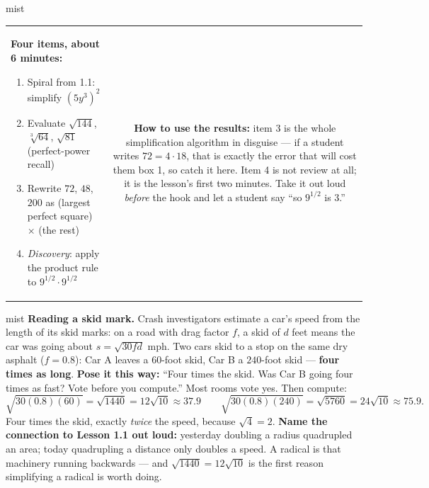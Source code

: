 \documentclass[10pt]{article}
\begin{document}
\begin{fixedskillbox}{mist}
\begin{tabularx}{\linewidth}{@{}X c@{}}
\begin{minipage}[t]{0.55\linewidth}\vspace{0pt}
\textbf{Four items, about 6 minutes:}
\begin{enumerate}[leftmargin=1.4em, itemsep=1pt, topsep=2pt]
  \item Spiral from 1.1: simplify $\left(5y^3\right)^2$
  \item Evaluate $\sqrt{144}$, $\sqrt[3]{64}$, $\sqrt{81}$ (perfect-power recall)
  \item Rewrite $72$, $48$, $200$ as (largest perfect square) $\times$ (the rest)
  \item \emph{Discovery}: apply the product rule to $9^{1/2}\cdot 9^{1/2}$
\end{enumerate}
\end{minipage}
&
\begin{minipage}[t]{0.38\linewidth}\vspace{0pt}
\textbf{How to use the results:} item 3 is the whole simplification algorithm in disguise --- if a
student writes $72=4\cdot 18$, that is exactly the error that will cost them box 1, so catch it
here. Item 4 is not review at all; it is the lesson's first two minutes. Take it out loud
\emph{before} the hook and let a student say ``so $9^{1/2}$ is $3$.''
\end{minipage}
\end{tabularx}
\end{fixedskillbox}

\begin{skillbox}[Hook]{mist}
\textbf{Reading a skid mark.} Crash investigators estimate a car's speed from the length of its
skid marks: on a road with drag factor $f$, a skid of $d$ feet means the car was going about
$s=\sqrt{30fd}$ mph. Two cars skid to a stop on the same dry asphalt ($f=0.8$): Car A leaves a
$60$-foot skid, Car B a $240$-foot skid --- \textbf{four times as long}. \textbf{Pose it this
way:} ``Four times the skid. Was Car B going four times as fast? Vote before you compute.'' Most
rooms vote yes. Then compute:
\[ \sqrt{30(0.8)(60)} = \sqrt{1440} = 12\sqrt{10} \approx 37.9 \qquad
   \sqrt{30(0.8)(240)} = \sqrt{5760} = 24\sqrt{10} \approx 75.9. \]
Four times the skid, exactly \emph{twice} the speed, because $\sqrt4=2$. \textbf{Name the
connection to Lesson 1.1 out loud:} yesterday doubling a radius quadrupled an area; today
quadrupling a distance only doubles a speed. A radical is that machinery running backwards --- and
$\sqrt{1440}=12\sqrt{10}$ is the first reason simplifying a radical is worth doing.
\end{skillbox}
\end{document}
